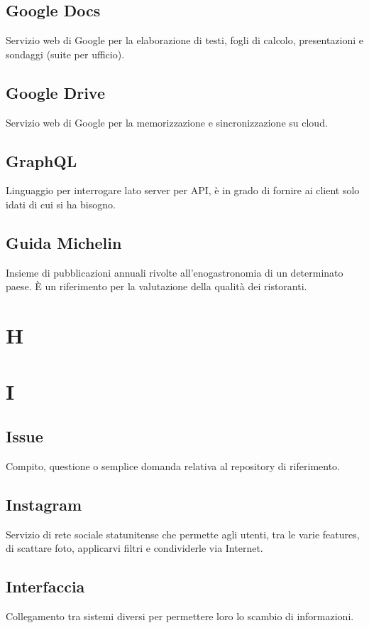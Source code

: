 \documentclass{classes/base}
\begin{document}
        \subsection*{Google Docs}
        Servizio web di Google per la elaborazione di testi, fogli di calcolo, presentazioni e sondaggi (suite per ufficio).
        
        \subsection*{Google Drive}
        Servizio web di Google per la memorizzazione e sincronizzazione su cloud.

        \subsection*{GraphQL}
        Linguaggio per interrogare lato server per API, è in grado di fornire ai client solo idati di cui si ha bisogno.

        \subsection*{Guida Michelin} 
        Insieme di pubblicazioni annuali rivolte all'enogastronomia di un determinato paese. È un riferimento per la valutazione della qualità dei ristoranti.
        \newpage  
    \section{H}
    \newpage  
    \section{I}
        \subsection*{Issue}
        Compito, questione o semplice domanda relativa al repository di riferimento.
        
        \subsection*{Instagram}
        Servizio di rete sociale statunitense che permette agli utenti, tra le varie features, di scattare foto, applicarvi filtri e condividerle via Internet.
        
        \subsection*{Interfaccia}
        Collegamento tra sistemi diversi per permettere loro lo scambio di informazioni.
\end{document}

